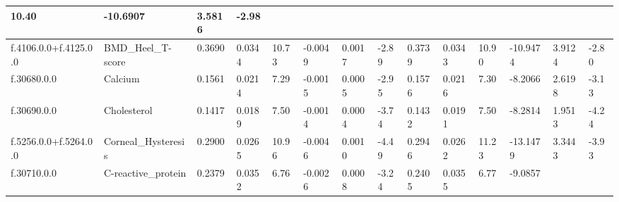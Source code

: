\begin{longtable}{llllllllllllll}
  \multicolumn{1}{l|}{10.40} &
  \multicolumn{1}{l|}{-10.6907} &
  \multicolumn{1}{l|}{3.5816} &
  \multicolumn{1}{l|}{-2.98} \\ \hline
\multicolumn{1}{|l|}{f.4106.0.0+f.4125.0.0} &
  \multicolumn{1}{l|}{BMD\_Heel\_T-score} &
  \multicolumn{1}{l|}{0.3690} &
  \multicolumn{1}{l|}{0.0344} &
  \multicolumn{1}{l|}{10.73} &
  \multicolumn{1}{l|}{-0.0049} &
  \multicolumn{1}{l|}{0.0017} &
  \multicolumn{1}{l|}{-2.89} &
  \multicolumn{1}{l|}{0.3739} &
  \multicolumn{1}{l|}{0.0343} &
  \multicolumn{1}{l|}{10.90} &
  \multicolumn{1}{l|}{-10.9474} &
  \multicolumn{1}{l|}{3.9124} &
  \multicolumn{1}{l|}{-2.80} \\ \hline
\multicolumn{1}{|l|}{f.30680.0.0} &
  \multicolumn{1}{l|}{Calcium} &
  \multicolumn{1}{l|}{0.1561} &
  \multicolumn{1}{l|}{0.0214} &
  \multicolumn{1}{l|}{7.29} &
  \multicolumn{1}{l|}{-0.0015} &
  \multicolumn{1}{l|}{0.0005} &
  \multicolumn{1}{l|}{-2.95} &
  \multicolumn{1}{l|}{0.1576} &
  \multicolumn{1}{l|}{0.0216} &
  \multicolumn{1}{l|}{7.30} &
  \multicolumn{1}{l|}{-8.2066} &
  \multicolumn{1}{l|}{2.6198} &
  \multicolumn{1}{l|}{-3.13} \\ \hline
\multicolumn{1}{|l|}{f.30690.0.0} &
  \multicolumn{1}{l|}{Cholesterol} &
  \multicolumn{1}{l|}{0.1417} &
  \multicolumn{1}{l|}{0.0189} &
  \multicolumn{1}{l|}{7.50} &
  \multicolumn{1}{l|}{-0.0014} &
  \multicolumn{1}{l|}{0.0004} &
  \multicolumn{1}{l|}{-3.74} &
  \multicolumn{1}{l|}{0.1432} &
  \multicolumn{1}{l|}{0.0191} &
  \multicolumn{1}{l|}{7.50} &
  \multicolumn{1}{l|}{-8.2814} &
  \multicolumn{1}{l|}{1.9513} &
  \multicolumn{1}{l|}{-4.24} \\ \hline
\multicolumn{1}{|l|}{f.5256.0.0+f.5264.0.0} &
  \multicolumn{1}{l|}{Corneal\_Hysteresis} &
  \multicolumn{1}{l|}{0.2900} &
  \multicolumn{1}{l|}{0.0265} &
  \multicolumn{1}{l|}{10.96} &
  \multicolumn{1}{l|}{-0.0046} &
  \multicolumn{1}{l|}{0.0010} &
  \multicolumn{1}{l|}{-4.49} &
  \multicolumn{1}{l|}{0.2946} &
  \multicolumn{1}{l|}{0.0262} &
  \multicolumn{1}{l|}{11.23} &
  \multicolumn{1}{l|}{-13.1479} &
  \multicolumn{1}{l|}{3.3443} &
  \multicolumn{1}{l|}{-3.93} \\ \hline
\multicolumn{1}{|l|}{f.30710.0.0} &
  \multicolumn{1}{l|}{C-reactive\_protein} &
  \multicolumn{1}{l|}{0.2379} &
  \multicolumn{1}{l|}{0.0352} &
  \multicolumn{1}{l|}{6.76} &
  \multicolumn{1}{l|}{-0.0026} &
  \multicolumn{1}{l|}{0.0008} &
  \multicolumn{1}{l|}{-3.24} &
  \multicolumn{1}{l|}{0.2405} &
  \multicolumn{1}{l|}{0.0355} &
  \multicolumn{1}{l|}{6.77} &
  \multicolumn{1}{l|}{-9.0857} &

\end{longtable}
